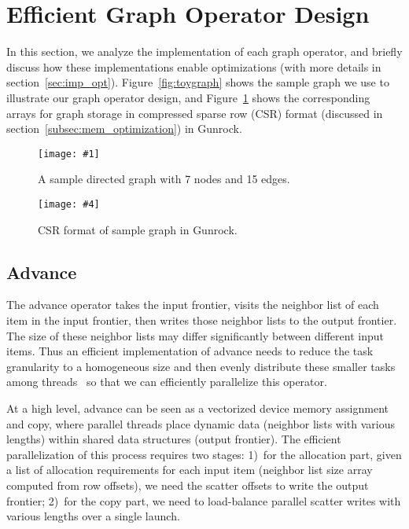 \documentclass[format=acmsmall,review=false,screen=true]{acmart}
\newcommand\TwoFig[6]{%
  \sbox\IBoxA{\texttt{[image: \#1]}}
  \sbox\IBoxB{\texttt{[image: \#4]}}%
  \ifdim\ht\IBoxA>\ht\IBoxB
    \setlength\IHeight{\ht\IBoxB}\else\setlength\IHeight{\ht\IBoxA}\fi%
  \begin{figure}[!htb]
  \minipage[t]{0.49\textwidth}\centering
  \texttt{[image: \#1]}
  \caption{#2}\label{#3}
  \endminipage\hfill
  \minipage[t]{0.49\textwidth}\centering
  \texttt{[image: \#4]}
  \caption{#5}\label{#6}
  \endminipage
  \end{figure}%
}
\begin{document}
\section{Efficient Graph Operator Design}
\label{sec:graph_operators}
In this section, we analyze the implementation of each graph operator,
and briefly discuss how these implementations enable optimizations
(with more details in section~\ref{sec:imp_opt}).
Figure~\ref{fig:toygraph} shows the sample graph we use to illustrate
our graph operator design, and Figure~\ref{fig:toygraph_data} shows
the corresponding arrays for graph storage in compressed sparse row
(CSR) format (discussed in section~\ref{subsec:mem_optimization}) in
Gunrock.

\TwoFig{graph.pdf}
{A sample directed graph with 7 nodes and 15 edges.}
{fig:toygraph}
{graph_data.pdf}
{CSR format of sample graph in Gunrock.}
{fig:toygraph_data}

\subsection{Advance}
The advance operator takes the input frontier, visits the neighbor
list of each item in the input frontier, then writes those neighbor
lists to the output frontier. The size of these neighbor lists may
differ significantly between different input items. Thus an efficient
implementation of advance needs to reduce the task granularity to a
homogeneous size and then evenly distribute these smaller tasks among
threads~\cite{Merrill:2012:SGG} so that we can efficiently parallelize
this operator.

At a high level, advance can be seen as a vectorized device memory
assignment and copy, where parallel threads
place dynamic data (neighbor lists with various lengths) within shared
data structures (output frontier). The efficient parallelization of
this process requires two stages: 1)~for the allocation part, given a
list of allocation requirements for each input item (neighbor list
size array computed from row offsets), we need the scatter offsets to
write the output frontier; 2)~for the copy part, we need to
load-balance parallel scatter writes with various lengths over a
single launch.
\end{document}
